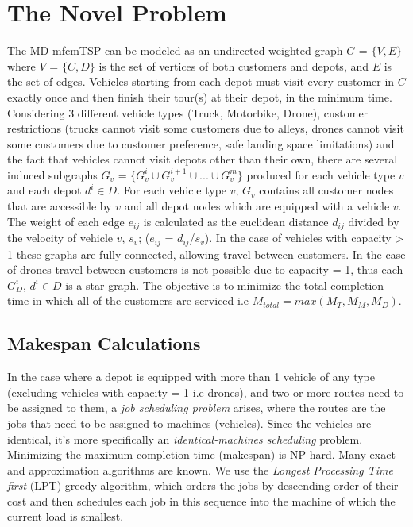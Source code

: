 \documentclass{article}
\begin{document}
	\section{The Novel Problem}
	The MD-mfcmTSP can be modeled as an undirected weighted graph $G$ = $\{V,E\}$ where $V$ = $\{C,D\}$ is the set of vertices of both customers and depots, and $E$ is the set of edges. Vehicles starting from each depot must visit every customer in $C$ exactly once and then finish their tour(s) at their depot, in the minimum time. Considering 3 different vehicle types (Truck, Motorbike, Drone), customer restrictions (trucks cannot visit some customers due to alleys, drones cannot visit some customers due to customer preference, safe landing space limitations) and the fact that vehicles cannot visit depots other than their own, there are several induced subgraphs  $G_v$ = $\{G_v^i\cup G_v^{i+1}\cup ...\cup G_v^{m}\}$ produced for each vehicle type $v$ and each depot $d^i\in D$. For each vehicle type $v$, $G_v$ contains all customer nodes that are accessible by $v$ and all depot nodes which are equipped with a vehicle $v$. The weight of each edge $e_{ij}$ is calculated as the euclidean distance $d_{ij}$ divided by the velocity of vehicle $v$, $s_v$; ($e_{ij}$ = $d_{ij}$/$s_v$). In the case of vehicles with capacity > 1 these graphs are fully connected, allowing travel between customers. In the case of drones travel between customers is not possible due to capacity = 1, thus each $G_D^i$, $d^i\in D$ is a star graph. The objective is to minimize the total completion time in which all of the customers are serviced i.e $M_{total} = max(M_T, M_M, M_D)$.
	\par
	\subsection{Makespan Calculations}
	In the case where a depot is equipped with more than 1 vehicle of any type (excluding vehicles with capacity = 1 i.e drones), and two or more routes need to be assigned to them, a \textit{job scheduling problem} arises, where the routes are the jobs that need to be assigned to machines (vehicles). Since the vehicles are identical, it's more specifically an \textit{identical-machines scheduling} problem. Minimizing the maximum completion time (makespan) is NP-hard. Many exact and approximation algorithms are known. We use the \textit{Longest Processing Time first} (LPT) greedy algorithm, which orders the jobs by descending order of their cost and then schedules each job in this sequence into the machine of which the current load is smallest.
	\par
\end{document}
